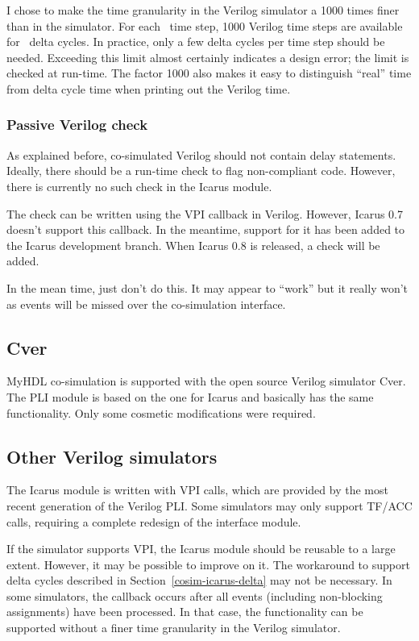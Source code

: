 I chose to make the time granularity in the Verilog simulator a 1000
times finer than in the \myhdl{} simulator. For each \myhdl\ time
step, 1000 Verilog time steps are available for \myhdl\ delta
cycles. In practice, only a few delta cycles per time step should be
needed. Exceeding this limit almost certainly indicates a design error;
the limit is checked at run-time. The factor 1000 also makes it
easy to distinguish ``real'' time from delta cycle time when printing
out the Verilog time.

\subsubsection{Passive Verilog check \label{cosim-icarus-pass}}

As explained before, co-simulated Verilog should not contain delay
statements. Ideally, there should be a run-time check to flag
non-compliant code. However, there is currently no such check in the
Icarus module.

The check can be written using the  VPI callback
in Verilog. However, Icarus 0.7 doesn't support this callback. In the
meantime, support for it has been added to the Icarus development
branch.  When Icarus 0.8 is released, a check will be added.

In the mean time, just don't do this. It may appear to ``work'' but it
really won't as events will be missed over the co-simulation
interface.


\subsection{Cver \label{cosim-cver}}

MyHDL co-simulation is supported with the open source Verilog
simulator Cver. The PLI module is based on the one for Icarus
and basically has the same functionality. Only some cosmetic
modifications were required.

\subsection{Other Verilog simulators \label{cosim-impl-verilog}}

The Icarus module is written with VPI calls, which are provided by the
most recent generation of the Verilog PLI. Some simulators may only
support TF/ACC calls, requiring a complete redesign of the interface
module.

If the simulator supports VPI, the Icarus module should be reusable to
a large extent. However, it may be possible to improve on it.  The
workaround to support delta cycles described in
Section~\ref{cosim-icarus-delta} may not be necessary. In some
simulators, the  callback occurs after all
events (including non-blocking assignments) have been processed. In
that case, the functionality can be supported without a finer time
granularity in the Verilog simulator.

